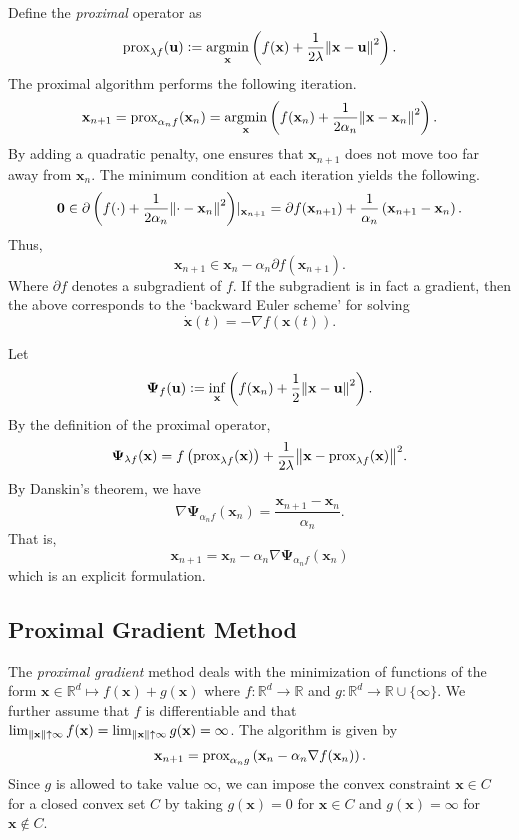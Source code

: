 Define the \textit{proximal} operator as
\[
    \text{prox}_{\lambda f}(\mathbf{u}) \vcentcolon= \operatorname*{argmin}_{\mathbf{x}} \left( f(\mathbf{x}) + \frac{1}{2\lambda} \norm{\mathbf{x} - \mathbf{u}}^2 \right).
\]
The proximal algorithm performs the following iteration.
\[
    \mathbf{x}_{n+1} = \text{prox}_{\alpha_n f}(\mathbf{x}_n) = \operatorname*{argmin}_{\mathbf{x}} \left( f(\mathbf{x}_n) + \frac{1}{2\alpha_n} \norm{\mathbf{x} - \mathbf{x}_n}^2 \right).
\]
By adding a quadratic penalty, one ensures that $\mathbf{x}_{n+1}$ does not move too far away from $\mathbf{x}_n$. The minimum condition at each iteration yields the following.
\[
    \mathbf{0} \in \partial \left( f(\cdot) + \frac{1}{2\alpha_n} \norm{\cdot - \mathbf{x}_n}^2 \right) \rvert_{\mathbf{x}_{n+1}} = \partial f(\mathbf{x}_{n+1}) + \frac{1}{\alpha_n} \left( \mathbf{x}_{n+1} - \mathbf{x}_n \right).
\] 
Thus, 
\[
    \mathbf{x}_{n+1} \in \mathbf{x}_n - \alpha_n \partial f(\mathbf{x}_{n+1}). 
\]
Where $\partial f$ denotes a subgradient of $f$. If the subgradient is in fact a gradient, then the above corresponds to the `backward Euler scheme' for solving 
\[
    \Dot{\mathbf{x}}(t) = -\nabla f(\mathbf{x}(t)).
\]

Let
\[
    \bm{\Psi}_f(\mathbf{u}) \vcentcolon= \inf_{\mathbf{x}} \left( f(\mathbf{x}_n) + \frac{1}{2} \norm{\mathbf{x} - \mathbf{u}}^2 \right).
\]
By the definition of the proximal operator, 
\[
    \bm{\Psi}_{\lambda f}(\mathbf{x}) = f\left( \text{prox}_{\lambda f}(\mathbf{x}) \right) + \frac{1}{2\lambda} \norm{\mathbf{x} - \text{prox}_{\lambda f}(\mathbf{x})}^2.
\]
By Danskin's theorem, we have
\[
    \nabla \bm{\Psi}_{\alpha_n f} (\mathbf{x}_n) = \frac{\mathbf{x}_{n+1} - \mathbf{x}_n}{\alpha_n}.
\]
That is,
\[
    \mathbf{x}_{n+1} = \mathbf{x}_n - \alpha_n \nabla \bm{\Psi}_{\alpha_n f} (\mathbf{x}_n)
\]
which is an explicit formulation. 

\subsection*{Proximal Gradient Method}

The \textit{proximal gradient} method deals with the minimization of functions of the form $\mathbf{x} \in \mathbb{R}^d \mapsto f(\mathbf{x}) + g(\mathbf{x})$ where $f \colon \mathbb{R}^d \to \mathbb{R}$ and $g \colon \mathbb{R}^d \to \mathbb{R} \cup \{\infty\}$. We further assume that $f$ is differentiable and that $\lim_{\norm{\mathbf{x}} \uparrow \infty} f(\mathbf{x}) = \lim_{\norm{\mathbf{x}} \uparrow \infty} g(\mathbf{x}) = \infty$. The algorithm is given by
\[
    \mathbf{x}_{n+1} = \text{prox}_{\alpha_n g} \left( \mathbf{x}_n - \alpha_n \nabla f(\mathbf{x}_n) \right).
\]  
Since $g$ is allowed to take value $\infty$, we can impose the convex constraint $\mathbf{x} \in C$ for a closed convex set $C$ by taking $g(\mathbf{x}) = 0$ for $\mathbf{x} \in C$ and $g(\mathbf{x}) = \infty$ for $\mathbf{x} \notin C$. 

